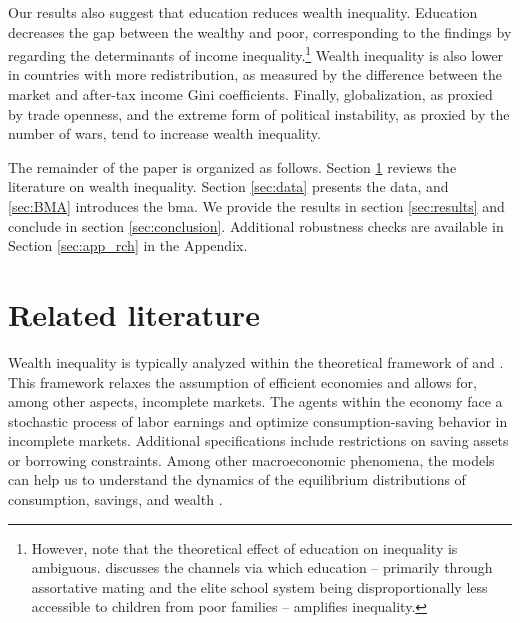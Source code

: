 \documentclass[a4paper,11pt]{article}
\begin{document}
Our results also suggest that education reduces wealth inequality. Education decreases the gap between the wealthy and poor, corresponding to the findings by \citet{dabla2015causes} regarding the determinants of income inequality.\footnote{However, note that the theoretical effect of education on inequality is ambiguous. \citet{scheidel} discusses the channels via which education -- primarily through assortative mating and the elite school system being disproportionally less accessible to children from poor families -- amplifies inequality.} Wealth inequality is also lower in countries with more redistribution, as measured by the difference between the market and after-tax income Gini coefficients. Finally, globalization, as proxied by trade openness, and the extreme form of political instability, as proxied by the number of wars, tend to increase wealth inequality. 

The remainder of the paper is organized as follows. Section \ref{sec:literature} reviews the literature on wealth inequality. Section \ref{sec:data} presents the data, and \ref{sec:BMA} introduces the \ac{bma}. We provide the results in section \ref{sec:results} and conclude in section \ref{sec:conclusion}. Additional robustness checks are available in Section \ref{sec:app_rch} in the Appendix.

\section{Related literature}
\label{sec:literature}

Wealth inequality is typically analyzed within the theoretical framework of \citet{bewley1977permanent} and \citet{Ayiagari1994}. This framework relaxes the assumption of efficient economies and allows for, among other aspects, incomplete markets. The agents within the economy face a stochastic process of labor earnings and optimize consumption-saving behavior in incomplete markets. Additional specifications include restrictions on saving assets or borrowing constraints. Among other macroeconomic phenomena, the models can help us to understand the dynamics of the equilibrium distributions of consumption, savings, and wealth \citep{BENHABIB2015489}.
\end{document}
